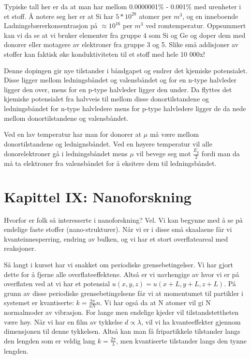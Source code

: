 \documentclass{article}
\begin{document}
Typiske tall her er da at man har mellom  0.0000001\% - 0.001\% med urenheter i et stoff. Å notere seg her er at Si har $5 * 10^{28}$ atomer per $m^3$, og en inneboende Ladningsbærerkonsentrasjon på $\approx 10^{16}$ per $m^3$ ved romtemperatur. Oppsummert kan vi da se at vi bruker elementer fra gruppe 4 som Si og Ge og doper dem med donorer eller motagere av elektroner fra gruppe 3 og 5. Slike små addisjoner av stoffer kan faktisk øke konduktiviteten til et stoff med hele 10 000x!

Denne dopingen gir nye tilstander i båndgapet og endrer det kjemiske potensialet. Disse ligger mellom ledningsbåndet og valensbåndet og for en n-type halvleder ligger den over, mens for en p-type halvleder ligger den under. Da flyttes det kjemiske potensialet fra halvveis til mellom disse donortilstandene og ledningsbåndet for n-type halvledere mens for p-type halvledere ligger de da nede mellom donortilstandene og  valensbåndet.

Ved en lav temperatur har man for donorer at $\mu$ må være mellom donortilstandene og lednignsbåndet. Ved en høyere temperatur vil alle donorelektroner gå i ledningsbåndet mens $\mu$ vil bevege seg mot $\frac{E_g}{2}$ fordi man da må ta elektroner fra valensbåndet for å eksitere dem til ledningsbåndet.
\section{Kapittel IX: Nanoforskning}
Hvorfor er  folk så interesserte i nanoforskning? Vel. Vi kan begynne med å se på endelige faste stoffer (nano-strukturer). Når vi er i disse små skaalaene får vi kvanteinnesperring, endring av bulken, og vi har et stort overflateareal med reaksjoner.

Så langt i kurset har vi snakket om periodiske grensebetingelser. Vi har gjort dette for å fjerne alle overflateeffektene. Altså er vi uavhengige av hvor vi er på overflaten ved at vi har et potensial $u(x,y,z)=u(x+L,y+L,z+L)$. På grunn av disse periodiske grensebetingelsene får vi at momentumet til partikler i systemet er kvantiserte: $k = \frac{2 \pi}{a N} n$. Vi har også da at N atomer vil gi N normalmoder av vibrasjon. For lange men endelige kjeder vil tilstandstettheten være høy. Når vi har en film av tykkelse $d \propto \lambda$, vil vi ha kvanteeffekter gjennom dimensjonen til denne tykkelsen. Altså kan man få fripartikkelø tilstander langs den lengden som er veldig lang $k = \frac{2\pi}{\lambda}$, men kvantiserte tilstander langs den tynne lengden.
\end{document}
